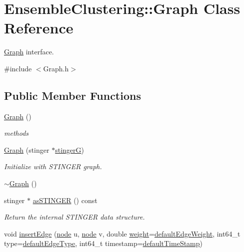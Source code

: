 \hypertarget{class_ensemble_clustering_1_1_graph}{\section{Ensemble\-Clustering\-:\-:Graph Class Reference}
\label{class_ensemble_clustering_1_1_graph}
}


\hyperlink{class_ensemble_clustering_1_1_graph}{Graph} interface.  




{\ttfamily \#include $<$Graph.\-h$>$}

\subsection*{Public Member Functions}
\begin{DoxyCompactItemize}
\item 
\hyperlink{class_ensemble_clustering_1_1_graph_a65031e76ae95333341f795fb9a13647f}{Graph} ()
\begin{DoxyCompactList}\small\item\em methods \end{DoxyCompactList}\item 
\hyperlink{class_ensemble_clustering_1_1_graph_a0ffcdfea431e8c85de2058a226a4783a}{Graph} (stinger $\ast$\hyperlink{class_ensemble_clustering_1_1_graph_af83709e85afb91c70729405a725afb9a}{stinger\-G})
\begin{DoxyCompactList}\small\item\em Initialize with S\-T\-I\-N\-G\-E\-R graph. \end{DoxyCompactList}\item 
\hyperlink{class_ensemble_clustering_1_1_graph_ac8368ff972ce067d51e37c48124a0038}{$\sim$\-Graph} ()
\item 
stinger $\ast$ \hyperlink{class_ensemble_clustering_1_1_graph_ad7ad5a71649990fe2b823b8ed7a113b7}{as\-S\-T\-I\-N\-G\-E\-R} () const 
\begin{DoxyCompactList}\small\item\em Return the internal S\-T\-I\-N\-G\-E\-R data structure. \end{DoxyCompactList}\item 
void \hyperlink{class_ensemble_clustering_1_1_graph_a78d527f03a3a860ee173dadbaefe1d5c}{insert\-Edge} (\hyperlink{namespace_ensemble_clustering_ae829290aeccd1a420b17a37fd901f114}{node} u, \hyperlink{namespace_ensemble_clustering_ae829290aeccd1a420b17a37fd901f114}{node} v, double \hyperlink{class_ensemble_clustering_1_1_graph_a9bff231567f9ac604f1854d62f6682d1}{weight}=\hyperlink{class_ensemble_clustering_1_1_graph_a8186ee969064a4e12b779b1dc506ac60}{default\-Edge\-Weight}, int64\-\_\-t type=\hyperlink{class_ensemble_clustering_1_1_graph_a377621f37c1dc58f32ecec0fd229408e}{default\-Edge\-Type}, int64\-\_\-t timestamp=\hyperlink{class_ensemble_clustering_1_1_graph_a9a6623d55f673a3b30e0c23284dd6da1}{default\-Time\-Stamp})

\end{DoxyCompactItemize}
